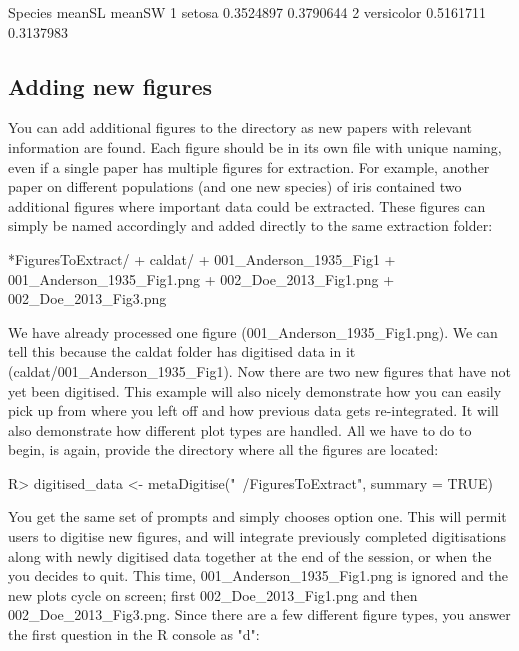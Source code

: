 \documentclass[12pt]{article}
\let\proglang=\textsf
\begin{document}
\begin{CodeChunk}
\begin{CodeOutput}
     Species    meanSL    meanSW
1     setosa 0.3524897 0.3790644
2 versicolor 0.5161711 0.3137983
\end{CodeOutput}
\end{CodeChunk}



\subsection{Adding new figures}

You can add additional figures to the directory as new papers with relevant information are found. Each figure should be in its own file with unique naming, even if a single paper has multiple figures for extraction. For example, another paper on different populations (and one new species) of iris contained two additional figures where important data could be extracted. These figures can simply be named accordingly and added directly to the same extraction folder: 

\begin{CodeChunk}
\begin{CodeOutput}
*FiguresToExtract/
    + caldat/
        + 001_Anderson_1935_Fig1
    + 001_Anderson_1935_Fig1.png
    + 002_Doe_2013_Fig1.png
    + 002_Doe_2013_Fig3.png
\end{CodeOutput}
\end{CodeChunk}

We have already processed one figure (001\_Anderson\_1935\_Fig1.png). We can tell this because the caldat folder has digitised data in it (caldat/001\_Anderson\_1935\_Fig1). Now there are two new figures that have not yet been digitised. This example will also nicely demonstrate how you can easily pick up from where you left off and how previous data gets re-integrated. It will also demonstrate how different plot types are handled. All we have to do to begin, is again, provide the directory where all the figures are located:

\begin{CodeChunk}
\begin{CodeInput}
R> digitised_data <- metaDigitise("~/FiguresToExtract", summary = TRUE)
\end{CodeInput}
\end{CodeChunk}

You get the same set of prompts and simply chooses option one. This will permit users to digitise new figures, and will integrate previously completed digitisations along with newly digitised data together at the end of the session, or when the you decides to quit. This time, 001\_Anderson\_1935\_Fig1.png is ignored and the new plots cycle on screen; first 002\_Doe\_2013\_Fig1.png and then 002\_Doe\_2013\_Fig3.png. Since there are a few different figure types, you answer the first question in the \proglang{R} console as "d":
\end{document}
